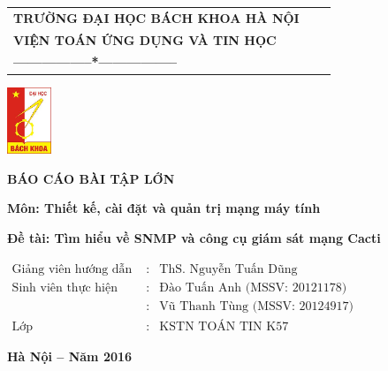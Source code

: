 \documentclass[12pt,oneside,a4paper,reqno]{report}
\begin{document}
\begin{large}

	\begin{titlepage}
\begin{longtable}{p{4cm}p{2cm}p{7cm}}
\centerline{\bf TRƯỜNG ĐẠI HỌC BÁCH KHOA HÀ NỘI}\\
\centerline{\bf VIỆN TOÁN ỨNG DỤNG VÀ TIN HỌC}\\
\centerline{\bf -----------------*-----------------}\\
\end{longtable}

\vspace*{1 cm}

\begin{center}
\includegraphics[width=0.1\textwidth]{images/bkhn.jpg}
\end{center}

\vspace*{1cm}
\centerline{\large\bf BÁO CÁO BÀI TẬP LỚN}

\centerline{\large\bf Môn: Thiết kế, cài đặt và quản trị mạng máy tính}
	
\vspace{1cm}
\centerline{\Large\bf  Đề tài: Tìm hiểu về SNMP và công cụ giám sát mạng Cacti}


\vspace*{1cm}

\begin{center}

$
\begin{array}{llll}
\text{Giảng viên hướng dẫn }&\text{:}
&\text{ThS.  Nguyễn Tuấn Dũng}
\\
\text{Sinh viên thực hiện }&\text{:}
&\text{Đào Tuấn Anh (MSSV: 20121178)}
\\
&\text{:}
&\text{Vũ Thanh Tùng (MSSV: 20124917)}
\\
\text{Lớp }&\text{:}&\text{KSTN TOÁN TIN K57}

\end{array}
$

\end{center}

\vfill
\centerline{\large\bf Hà Nội -- Năm 2016}
\vspace*{0.3cm}
\end{titlepage}
	

\end{large}
\end{document}
